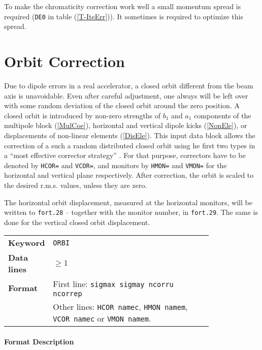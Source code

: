 To make the chromaticity correction work well a small momentum spread is required (\texttt{DE0} in table (\ref{T-IteErr})).
It sometimes is required to optimize this spread.

\section{Orbit Correction} \label{OrbCorr}

Due to dipole errors in a real accelerator, a closed orbit different from the beam axis is unavoidable.
Even after careful adjustment, one always will be left over with some random deviation of the closed orbit around the zero position.
A closed orbit is introduced by non-zero strengths of $b_{1}$ and $a_{1}$ components of the multipole block (\ref{MulCoe}), horizontal and vertical dipole kicks (\ref{NonEle}), or displacements of non-linear elements (\ref{DisEle}).
This input data block allows the correction of a such a random distributed closed orbit using he first two types in a ``most effective corrector strategy'' \cite{Auti}.
For that purpose, correctors have to be denoted by \texttt{HCOR=} and \texttt{VCOR=}, and monitors by \texttt{HMON=} and \texttt{VMON=} for the horizontal and vertical plane respectively.
After correction, the orbit is scaled to the desired r.m.s. values, unless they are zero.

The horizontal orbit displacement, measured at the horizontal monitors, will be written to \texttt{fort.28} -- together with the monitor number, in \texttt{fort.29}. The same is done for the vertical closed orbit displacement. 

\bigskip
\begin{tabular}{@{}lp{0.8\linewidth}}
    \textbf{Keyword}    & \texttt{ORBI} \\
    \textbf{Data lines} & $\geq 1$ \\
    \textbf{Format}     & First line: \texttt{sigmax sigmay ncorru ncorrep} \\
                        & Other lines: \texttt{HCOR namec}, \texttt{HMON namem}, \texttt{VCOR namec} or \texttt{VMON namem}.\\
\end{tabular}

\paragraph{Format Description}~

